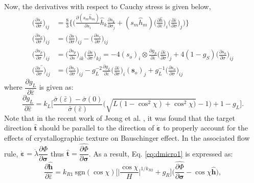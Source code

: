 \documentclass[12pt]{amsart}
\begin{document}
Now, the derivatives with respect to Cauchy stress is given below,
\begin{equation}
  \label{eq:dsp_dsig}
  \begin{split}
    \bigg(\frac{\partial s_c}{\partial \sigma}\bigg)_{ij}&=\frac{8}{3}\Bigg\{\Bigg( \frac{\partial (s_m\hat{h}_m)}{\partial s_i}\hat{h}_k\frac{\partial s_k}{\partial\sigma_j} +(s_m\hat{h}_m) \bigg(\frac{\partial\hat{h}}{\partial\bar{\varepsilon}}\bigg)_i\bigg(\frac{\partial\bar{\varepsilon}}{\partial\sigma}\bigg)_j\Bigg)\Bigg\}\\
    \bigg(\frac{\partial s_o}{\partial \sigma}\bigg)_{ij}&=\bigg(\frac{\partial s}{\partial\sigma}\bigg)_{ij}-\bigg(\frac{\partial s_c}{\partial \sigma}\bigg)_{ij}\\
    \bigg(\frac{\partial s_p}{\partial \sigma}\bigg)_{ij}&=\bigg(\frac{\partial s_p}{\partial s}\bigg)_{ik} \bigg(\frac{\partial s}{\partial \sigma}\bigg)_{kj}= -4(s_o)_i\otimes\frac{\partial g_S}{\partial \bar{\varepsilon}}\bigg(\frac{\partial\bar{\varepsilon}}{\partial\sigma}\bigg)_j + 4(1-g_S) \bigg(\frac{\partial s_o}{\partial \sigma}\bigg)_{ij}\\
    \bigg(\frac{\partial s^{\prime\prime}}{\partial\sigma}\bigg)_{ij}&=\bigg(\frac{\partial s_c}{\partial\sigma}\bigg)_{ij}-g_L^{-2}\frac{\partial g_L}{\partial\bar{\varepsilon}}\bigg(\frac{\partial\bar{\varepsilon}}{\partial\sigma}\bigg)_{i}(\mathbf{s}_o)_j+g_L^{-1}\bigg(\frac{\partial s_o}{\partial\sigma}\bigg)_{ij}
  \end{split}
\end{equation}
where $\dfrac{\partial g_L}{\partial\bar{\varepsilon}}$ is given as:
\begin{equation}
  \label{eq:dgl_de}
  \dfrac{\partial g_L}{\partial\bar{\varepsilon}}=k_L\bigg[\frac{\bar{\sigma}(\bar{\varepsilon})-\bar{\sigma}(0)}{\bar{\sigma}(\bar{\varepsilon})}
  \Big(\sqrt{L(1-\cos^2\chi)+\cos^2\chi)}-1\Big)+1-g_L\bigg].
\end{equation}
Note that in the recent work of Jeong et al. \cite{Jeong2016}, it was found that the target direction $\hat{\mathbf{t}}$ should be parallel to the direction of $\dot{\mathbf{\varepsilon}}$ to properly account for the effects of crystallographic texture on Bauschinger effect.
In the associated flow rule, $\dot{\mathbf{\varepsilon}}=\dot{\lambda}\dfrac{\partial\Phi}{\partial\mathbf{\sigma}}$ thus $\hat{\mathbf{t}}=\hat{\dfrac{\partial\Phi}{\partial\mathbf{\sigma}}}$.
As a result, Eq. \ref{eq:dmicro1} is expressed as:
\begin{equation}
  \label{eq:dmicro3}
  \frac{\partial\hat{\mathbf{h}}}{\partial \bar{\varepsilon}} = k_{R1}\ \text{sgn}(\cos\chi)\bigg[\Big|\frac{\cos\chi}{H}\Big|^{1/k_{R2}} +g_R \bigg] \bigg(\hat{\dfrac{\partial\Phi}{\partial\mathbf{\sigma}}}-\cos\chi \hat{\mathbf{h}}\bigg),
\end{equation}
\end{document}
